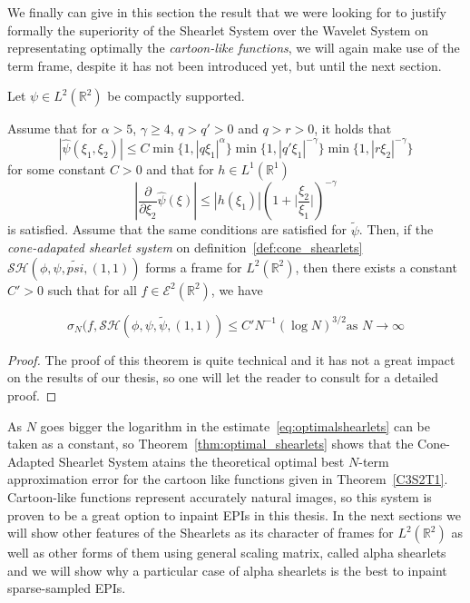 We finally can give in this section the result that we were looking for to justify formally the superiority of the Shearlet System over the Wavelet System on representating optimally the \textit{cartoon-like functions}, we will again make use of the term frame, despite it has not been introduced yet, but until the next section.

\begin{thm}
\label{thm:optimal_shearlets}
Let $\psi\in L^2(\mathbb{R}^2)$ be compactly supported.

Assume that  for $\alpha>5$, $\gamma\geq 4$, $q>q'>0$ and $q>r>0$, it holds that
\begin{equation}
\label{eq:boundframe}
|\hat{\psi}(\xi_1,\xi_2)|\leq C \min\{1,|q\xi_1|^{\alpha}\}\min\{1,|q'\xi_1|^{-\gamma}\}\min\{1,|r\xi_2|^{-\gamma}\}
\end{equation}
for some constant $C>0$ and that for $h\in L^1(\mathbb{R}^1)$ 
$$
|\frac{\partial}{\partial\xi_2}\hat{\psi}(\xi)|\leq |h(\xi_1)|\left(1+\big| \frac{\xi_2}{\xi_1}\big|\right)^{-\gamma}
$$
is satisfied. Assume that the same conditions are satisfied for $\tilde{\psi}$. Then, if the \textit{cone-adapated shearlet system} on definition~\ref{def:cone_shearlets} $\mathcal{SH}(\phi,\psi,\tilde{psi},(1,1))$ forms a frame for $L^2(\mathbb{R}^2)$, then there exists a constant $C'>0$ such that for all $f\in\mathcal{E}^2(\mathbb{R}^2)$, we have 

\begin{equation}
\label{eq:optimalshearlets}
\sigma_N(f,\mathcal{SH}(\phi,\psi,\tilde{\psi},(1,1))\leq C'N^{-1}(\log N)^{3/2} \text{as  } N\longrightarrow\infty
\end{equation}
\end{thm}
\begin{proof}
The proof of this theorem is quite technical and it has not a great impact on the results of our thesis, so one will let the reader to consult \cite{FirstShearlets} for a detailed proof. 
\end{proof}

As $N$ goes bigger the logarithm in the estimate~\ref{eq:optimalshearlets} can be taken as a constant, so Theorem~\ref{thm:optimal_shearlets} shows that the Cone-Adapted Shearlet System atains the theoretical optimal best $N$-term approximation error for the cartoon like functions given in Theorem~\ref{C3S2T1}. Cartoon-like functions represent accurately natural images, so this system is proven to be a great option to inpaint EPIs in this thesis. In the next sections we will show other features of the Shearlets as its character of frames for $L^2(\mathbb{R}^2)$ as well as other forms of them using general scaling matrix, called alpha shearlets and we will show why a particular case of alpha shearlets is the best to inpaint sparse-sampled EPIs.

